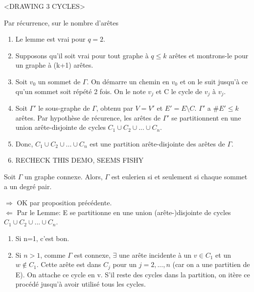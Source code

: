\begin{exmp}
<DRAWING 3 CYCLES>\\
\end{exmp}

\begin{demo}
Par récurrence, sur le nombre d'arêtes
	\begin{enumerate}
		\item Le lemme est vrai pour $q=2$.
		\item Supposons qu'il soit vrai pour tout graphe à $q \leq k$ arêtes et montrons-le pour un graphe à (k+1) arêtes.
		\item Soit $v_{0}$ un sommet de $\Gamma$. On démarre un chemin en $v_{0}$ et on le suit jusqu'à ce qu'un sommet soit répété 2 fois. On le note $v_{j}$ et C le cycle de $v_{j}$ à $v_{j}$.
		\item Soit ${\Gamma}'$ le sous-graphe de $\Gamma$, obtenu par $V={V}'$ et ${E}'=E \setminus C$. ${\Gamma}'$ a $\#{E}' \leq k$ arêtes. Par hypothèse de récurence, les arêtes de ${\Gamma}'$ se partitionnent en une union arête-disjointe de cycles $C_{1} \cup C_{2} \cup ... \cup C_{n}$.
		\item Donc, $C_{1} \cup C_{2} \cup ... \cup C_{n}$ est une partition arête-disjointe des arêtes de $\Gamma$.
		\item RECHECK THIS DEMO, SEEMS FISHY\\
	\end{enumerate}
\end{demo}

\begin{thrm}
Soit $\Gamma$ un graphe connexe. Alors, $\Gamma$ est eulerien si et seulement si chaque sommet a un degré pair.\\
\end{thrm}

\begin{demo}
$\Rightarrow$ OK par proposition précédente.\\
$\Leftarrow$ Par le Lemme: E se partitionne en une union (arête-)disjointe de cycles $C_{1} \cup C_{2} \cup ... \cup C_{n}$.
	\begin{enumerate}
		\item Si n=1, c'est bon.
		\item Si $n>1$, comme $\Gamma$ est connexe, $\exists$ une arête incidente à un $v \in C_{1}$ et un $w \notin C_{1}$. Cette arête est dans $C_{j}$ pour un $j=2,...,n$ (car on a une partitien de E). On attache ce cycle en v. S'il reste des cycles dans la partition, on itère ce procédé jusqu'à avoir utilisé tous les cycles.\\
	\end{enumerate}
\end{demo}

